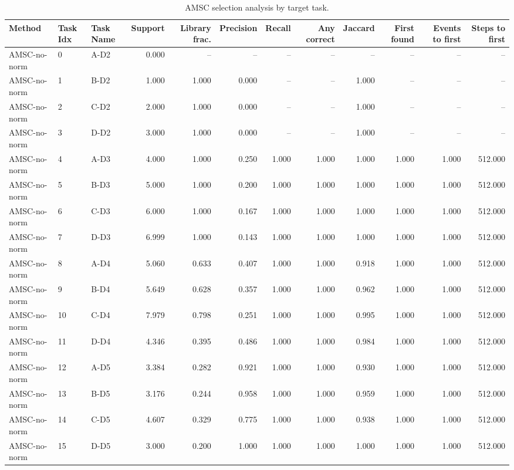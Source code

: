 \begin{table}[ht]
    \caption{AMSC selection analysis by target task.}
    \label{tbl:amsc_selection_task}
    \centering
    \scriptsize
    \begin{tabular}{lllrrrrrrrrr}
    \toprule
Method & Task Idx & Task Name & Support & Library frac. & Precision & Recall & Any correct & Jaccard & First found & Events to first & Steps to first \\
    \midrule
AMSC-no-norm & 0 & A-D2 & 0.000 & -- & -- & -- & -- & -- & -- & -- & -- \\
AMSC-no-norm & 1 & B-D2 & 1.000 & 1.000 & 0.000 & -- & -- & 1.000 & -- & -- & -- \\
AMSC-no-norm & 2 & C-D2 & 2.000 & 1.000 & 0.000 & -- & -- & 1.000 & -- & -- & -- \\
AMSC-no-norm & 3 & D-D2 & 3.000 & 1.000 & 0.000 & -- & -- & 1.000 & -- & -- & -- \\
AMSC-no-norm & 4 & A-D3 & 4.000 & 1.000 & 0.250 & 1.000 & 1.000 & 1.000 & 1.000 & 1.000 & 512.000 \\
AMSC-no-norm & 5 & B-D3 & 5.000 & 1.000 & 0.200 & 1.000 & 1.000 & 1.000 & 1.000 & 1.000 & 512.000 \\
AMSC-no-norm & 6 & C-D3 & 6.000 & 1.000 & 0.167 & 1.000 & 1.000 & 1.000 & 1.000 & 1.000 & 512.000 \\
AMSC-no-norm & 7 & D-D3 & 6.999 & 1.000 & 0.143 & 1.000 & 1.000 & 1.000 & 1.000 & 1.000 & 512.000 \\
AMSC-no-norm & 8 & A-D4 & 5.060 & 0.633 & 0.407 & 1.000 & 1.000 & 0.918 & 1.000 & 1.000 & 512.000 \\
AMSC-no-norm & 9 & B-D4 & 5.649 & 0.628 & 0.357 & 1.000 & 1.000 & 0.962 & 1.000 & 1.000 & 512.000 \\
AMSC-no-norm & 10 & C-D4 & 7.979 & 0.798 & 0.251 & 1.000 & 1.000 & 0.995 & 1.000 & 1.000 & 512.000 \\
AMSC-no-norm & 11 & D-D4 & 4.346 & 0.395 & 0.486 & 1.000 & 1.000 & 0.984 & 1.000 & 1.000 & 512.000 \\
AMSC-no-norm & 12 & A-D5 & 3.384 & 0.282 & 0.921 & 1.000 & 1.000 & 0.930 & 1.000 & 1.000 & 512.000 \\
AMSC-no-norm & 13 & B-D5 & 3.176 & 0.244 & 0.958 & 1.000 & 1.000 & 0.959 & 1.000 & 1.000 & 512.000 \\
AMSC-no-norm & 14 & C-D5 & 4.607 & 0.329 & 0.775 & 1.000 & 1.000 & 0.938 & 1.000 & 1.000 & 512.000 \\
AMSC-no-norm & 15 & D-D5 & 3.000 & 0.200 & 1.000 & 1.000 & 1.000 & 1.000 & 1.000 & 1.000 & 512.000 \\

\end{tabular}
\end{table}
